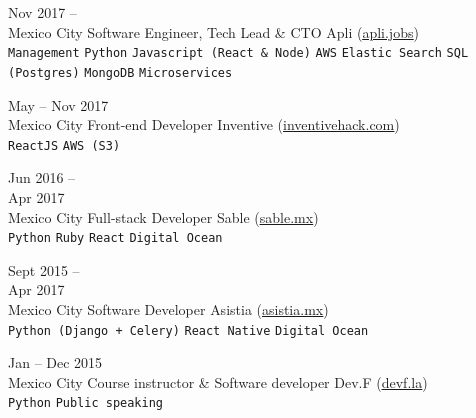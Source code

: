 \documentclass[9pt]{developercv} %
\begin{document}
\begin{entrylist}
    \entry
        {
            Nov 2017 --
            \\\footnotesize{Mexico City}
        }
        {Software Engineer, Tech Lead \& CTO}
        {Apli ({\href{https://apli.jobs/}{\underline{apli.jobs}}})}
        {
            \lorem \lorem\\
            \texttt{Management}
            \slashsep\texttt{Python}
            \slashsep\texttt{Javascript (React \& Node)}
            \slashsep\texttt{AWS}
            \slashsep\texttt{Elastic Search}
            \slashsep\texttt{SQL (Postgres)}
            \slashsep\texttt{MongoDB}
            \slashsep\texttt{Microservices}
        }

    \entry
        {
            May -- Nov 2017
            \\\footnotesize{Mexico City}
        }
        {Front-end Developer}
        {Inventive ({\href{https://www.linkedin.com/company/inventivehack/}{\underline{inventivehack.com}}})}
        {
            \lorem \lorem\\
            \texttt{ReactJS}
            \slashsep\texttt{AWS (S3)}
        }

    \entry
        {
            Jun 2016 -- \\Apr 2017
            \\\footnotesize{Mexico City}
        }
        {Full-stack Developer}
        {Sable ({\href{https://sable.mx/}{\underline{sable.mx}}})}
        {
            \lorem \lorem \lorem\\
            \texttt{Python}
            \slashsep\texttt{Ruby}
            \slashsep\texttt{React}
            \slashsep\texttt{Digital Ocean}
        }

    \entry
        {
            Sept 2015 --\\Apr 2017
            \\\footnotesize{Mexico City}
        }
        {Software Developer}
        {Asistia ({\href{https://www.linkedin.com/company/asistia/}{\underline{asistia.mx}}})}
        {
            \lorem \lorem \lorem\\
            \texttt{Python (Django + Celery)}
            \slashsep\texttt{React Native}
            \slashsep\texttt{Digital Ocean}}

    \entry
        {
            Jan -- Dec 2015
            \\\footnotesize{Mexico City}
        }
        {Course instructor \& Software developer}
        {Dev.F ({\href{https://devf.la/}{\underline{devf.la}}})}
        {
            \lorem \lorem \lorem\\
            \texttt{Python}
            \slashsep\texttt{Public speaking}
        }


\end{entrylist}
\end{document}
